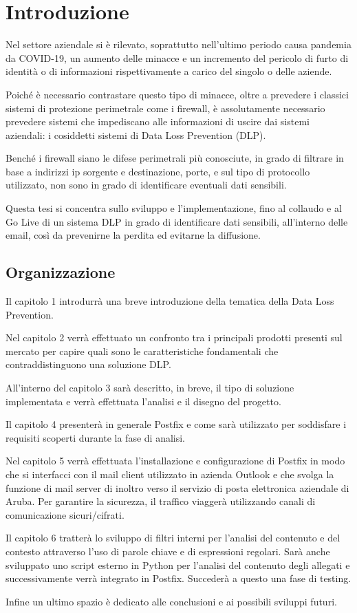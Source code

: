 \chapter{Introduzione}

Nel settore aziendale si è rilevato, soprattutto nell’ultimo periodo causa pandemia da COVID-19, un aumento delle minacce e un incremento del pericolo di furto di identità o di informazioni rispettivamente a carico del singolo o delle aziende.

Poiché è necessario contrastare questo tipo di minacce, oltre a prevedere i classici sistemi di protezione perimetrale come i firewall, è assolutamente necessario prevedere sistemi che impediscano alle informazioni di uscire dai sistemi aziendali: i cosiddetti sistemi di Data Loss Prevention (DLP).

Benché i firewall siano le difese perimetrali più conosciute, in grado di filtrare in base a indirizzi ip sorgente e destinazione, porte, e sul tipo di protocollo utilizzato, non sono in grado di identificare eventuali dati sensibili.

Questa tesi si concentra sullo sviluppo e l’implementazione, fino al collaudo e al Go Live di un sistema DLP in grado di identificare dati sensibili, all'interno delle email, così da prevenirne la perdita ed evitarne la diffusione.

\section{Organizzazione}

Il capitolo 1 introdurrà una breve introduzione della tematica della Data Loss Prevention.

Nel capitolo 2 verrà effettuato un confronto tra i principali prodotti presenti sul mercato per capire 
quali sono le caratteristiche fondamentali che contraddistinguono una soluzione DLP.


All’interno del capitolo 3 sarà descritto, in breve, il tipo di soluzione implementata e verrà 
effettuata l’analisi e il disegno del progetto.


Il capitolo 4 presenterà in generale Postfix e come sarà utilizzato per soddisfare i requisiti 
scoperti durante la fase di analisi.


Nel capitolo 5 verrà effettuata l’installazione e configurazione di 
Postfix in modo che si interfacci con il mail client utilizzato in azienda Outlook e che svolga 
la funzione di mail server di inoltro verso il servizio di posta elettronica aziendale di Aruba. 
Per garantire la sicurezza, il traffico viaggerà utilizzando canali di comunicazione sicuri/cifrati.


Il capitolo 6 tratterà lo sviluppo di filtri interni per l’analisi del contenuto e del contesto attraverso 
l’uso di parole chiave e di espressioni regolari.
Sarà anche sviluppato uno script esterno in Python per l’analisi del contenuto degli allegati e successivamente 
verrà integrato in Postfix. Succederà a questo una fase di testing.


Infine un ultimo spazio è dedicato alle conclusioni e ai possibili sviluppi futuri.